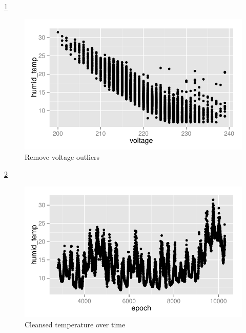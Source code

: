 \documentclass{article}\usepackage[]{graphicx}\usepackage[]{color}
\makeatletter
\def\maxwidth{ %
  \ifdim\Gin@nat@width>\linewidth
    \linewidth
  \else
    \Gin@nat@width
  \fi
}
\newenvironment{knitrout}{}{} %
\makeatother
\begin{document}
\ref{fig:plot_cleansed_net_voltage_temperature}
\begin{knitrout}
\color{fgcolor}\begin{figure}[h!]


{\centering \includegraphics[width=\maxwidth]{figure/plot_cleansed_net_voltage_temperature} 

}

\caption[Remove voltage outliers]{Remove voltage outliers\label{fig:plot_cleansed_net_voltage_temperature}}
\end{figure}


\end{knitrout}

\ref{fig:plot_cleansed_net_epoch_temperature}
\begin{knitrout}
\color{fgcolor}\begin{figure}[h!]


{\centering \includegraphics[width=\maxwidth]{figure/plot_cleansed_net_epoch_temperature} 

}

\caption[Cleansed temperature over time]{Cleansed temperature over time\label{fig:plot_cleansed_net_epoch_temperature}}
\end{figure}


\end{knitrout}
\end{document}
